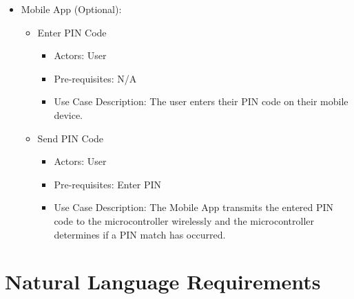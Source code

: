 \begin{itemize}
    \item Mobile App (Optional):
        \begin{itemize}
            \item Enter PIN Code
            \begin{itemize}
                \item Actors: User
                \item Pre-requisites: N/A
                \item Use Case Description: The user enters their PIN code on their mobile device. 
            \end{itemize}

            \item Send PIN Code
            \begin{itemize}
                \item Actors: User
                \item Pre-requisites: Enter PIN 
                \item Use Case Description: The Mobile App transmits the entered PIN code to the microcontroller wirelessly and the microcontroller determines if a PIN match has occurred.

            \end{itemize}
        \end{itemize}
\end{itemize}

\newpage \section{Natural Language Requirements}

